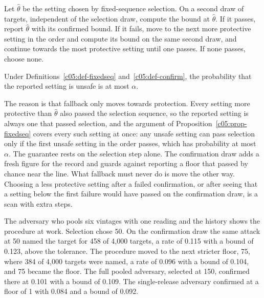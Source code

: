 \begin{definition}\label{c05:def-confirm}
Let $\hat\theta$ be the setting chosen by fixed-sequence selection. On a second draw of
targets, independent of the selection draw, compute the bound at $\hat\theta$. If it
passes, report $\hat\theta$ with its confirmed bound. If it fails, move to the next more
protective setting in the order and compute its bound on the same second draw, and
continue towards the most protective setting until one passes. If none passes, choose
none.
\end{definition}

\begin{proposition}\label{c05:prop-confirm}
Under Definitions~\ref{c05:def-fixedseq} and~\ref{c05:def-confirm}, the probability that
the reported setting is unsafe is at most $\alpha$.
\end{proposition}

The reason is that fallback only moves towards protection. Every setting more protective
than $\hat\theta$ also passed the selection sequence, so the reported setting is always
one that passed selection, and the argument of Proposition~\ref{c05:prop-fixedseq} covers
every such setting at once: any unsafe setting can pass selection only if the first unsafe
setting in the order passes, which has probability at most $\alpha$. The guarantee rests
on the selection step alone. The confirmation draw adds a fresh figure for the record and
guards against reporting a floor that passed by chance near the line. What fallback must
never do is move the other way. Choosing a less protective setting after a failed
confirmation, or after seeing that a setting below the first failure would have passed on
the confirmation draw, is a scan with extra steps.

The adversary who pools six vintages with one reading and the history shows the procedure
at work. Selection chose 50. On the confirmation draw the same attack at 50 named the
target for 458 of 4,000 targets, a rate of 0.115 with a bound of 0.123, above the
tolerance. The procedure moved to the next stricter floor, 75, where 384 of 4,000 targets
were named, a rate of 0.096 with a bound of 0.104, and 75 became the floor.
The full pooled adversary, selected at 150, confirmed there at 0.101 with a bound of
0.109.
The single-release adversary confirmed at a floor of 1 with 0.084 and a bound of 0.092.

